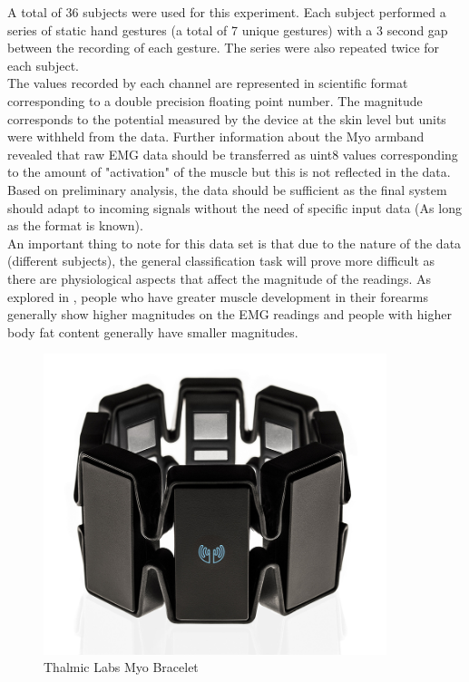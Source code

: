 \documentclass[11pt]{article}
\begin{document}
	\noindent
	A total of 36 subjects were used for this experiment. Each subject performed a series of static hand gestures (a total of 7 unique gestures) with a 3 second gap between the recording of each gesture. The series were also repeated twice for each subject.\\
	
	\noindent
	The values recorded by each channel are represented in scientific format corresponding to a double precision floating point number. The magnitude corresponds to the potential measured by the device at the skin level but units were withheld from the data. Further information about the Myo armband revealed that raw EMG data should be transferred as uint8 values corresponding to the amount of "activation" of the muscle \cite{myo_data} but this is not reflected in the data. Based on preliminary analysis, the data should be sufficient as the final system should adapt to incoming signals without the need of specific input data (As long as the format is known). \\
	
	\noindent
	An important thing to note for this data set is that due to the nature of the data (different subjects), the general classification task will prove more difficult as there are physiological aspects that affect the magnitude of the readings. As explored in \cite{Lobov2018}, people who have greater muscle development in their forearms generally show higher magnitudes on the EMG readings and people with higher body fat content generally have smaller magnitudes.
	
	\begin{figure}[H]
		\centering
		\includegraphics[width=10cm]{Figures/myo_armband}
		\caption{Thalmic Labs Myo Bracelet}
		\label{fig:myo}
	\end{figure}
\end{document}
